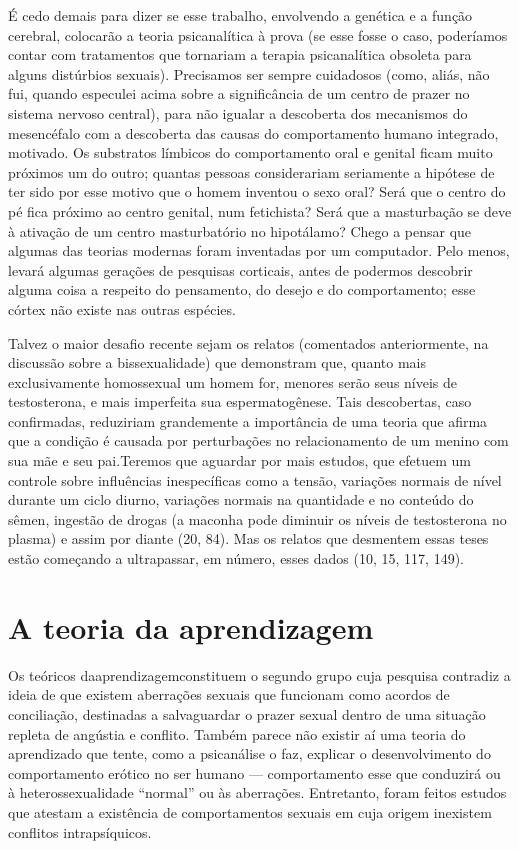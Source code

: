  É cedo demais para dizer se esse trabalho, envolvendo a genética e a
função cerebral, colocarão a teoria psicanalítica à prova (se esse
fosse o caso, poderíamos contar com tratamentos\idxhomostrat{} que tornariam a
terapia psicanalítica obsoleta para alguns distúrbios sexuais).
Precisamos ser sempre cuidadosos (como, aliás, não fui, quando
especulei acima sobre a significância de um centro de prazer no sistema
nervoso central), para não igualar a descoberta dos mecanismos do
mesencéfalo\idxcerebmeca{} com a descoberta das causas do comportamento humano
integrado, motivado. Os substratos límbicos do comportamento oral e
genital ficam muito próximos um do outro; quantas pessoas considerariam
seriamente a hipótese de ter sido por esse motivo que o homem inventou
o sexo oral? Será que o centro do pé fica próximo ao centro genital,
num fetichista? Será que a masturbação\idxmastur{} se deve à ativação de um centro
masturbatório no hipotálamo? Chego a pensar que algumas das teorias
modernas foram inventadas por um computador. Pelo menos, levará algumas
gerações de pesquisas corticais, antes de podermos descobrir alguma
coisa a respeito do pensamento, do desejo e do comportamento; esse
córtex não existe nas outras espécies.

 Talvez o maior desafio recente sejam os relatos (comentados
anteriormente, na discussão sobre a bissexualidade) que demonstram que,
quanto mais exclusivamente homossexual\idxhomosbiol{} um homem for, menores serão seus
níveis de testosterona,\idxhormhomo{} e mais imperfeita sua espermatogênese. Tais
descobertas, caso confirmadas, reduziriam grandemente a importância
de uma teoria que afirma que a condição é causada por perturbações no
relacionamento de um menino com sua mãe e seu pai.\idxaberrfisic[|)] Teremos que aguardar
por mais estudos, que efetuem um controle sobre influências
inespecíficas como a tensão, variações normais de nível durante um
ciclo diurno, variações normais na quantidade e no conteúdo do sêmen,
ingestão de drogas (a maconha\idxmarij{} pode diminuir os níveis de testosterona
no plasma) e assim por diante (20, 84). Mas os relatos que desmentem
essas teses estão começando a ultrapassar, em número, esses dados (10,
15, 117, 149).

\section{A teoria da aprendizagem}

Os teóricos da\idxsocia[|(] aprendizagem\idxaberrteor[|(] constituem o segundo grupo cuja pesquisa
contradiz a ideia de que existem aberrações sexuais que funcionam
como acordos de conciliação, destinadas a salvaguardar o prazer sexual
dentro de uma situação repleta de angústia e conflito. Também parece
não existir aí uma teoria do aprendizado que tente, como a psicanálise
o faz, explicar o desenvolvimento do comportamento erótico no ser
humano --- comportamento esse que conduzirá ou à heterossexualidade
``normal'' ou às aberrações. Entretanto,
foram feitos estudos que atestam a existência de comportamentos
sexuais em cuja origem inexistem conflitos intrapsíquicos.

